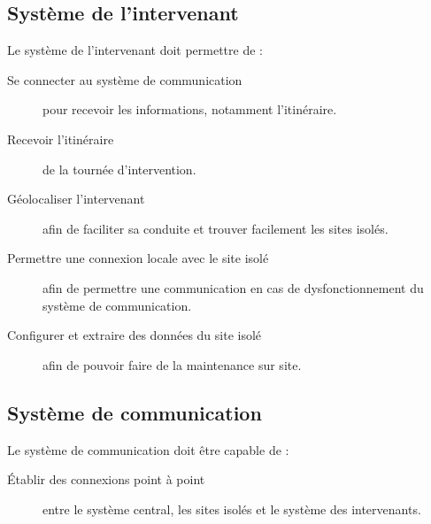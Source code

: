\documentclass[a4paper, 11pt]{article}
\begin{document}
\subsection{Système de l'intervenant}
Le système de l'intervenant doit permettre de :
\begin{description}
	\item [Se connecter au système de communication] pour recevoir les informations, notamment l'itinéraire.
	\item [Recevoir l'itinéraire] de la tournée d'intervention.
	\item [Géolocaliser l'intervenant] afin de faciliter sa conduite et trouver facilement les sites isolés.
	\item [Permettre une connexion locale avec le site isolé] afin de permettre une communication en cas de dysfonctionnement du système de communication.
	\item [Configurer et extraire des données du site isolé] afin de pouvoir faire de la maintenance sur site.
\end{description}

\subsection{Système de communication}
Le système de communication doit être capable de :
\begin{description}
	\item[Établir des connexions point à point] entre le système central, les sites isolés et le système des intervenants.
\end{description}
\end{document}
